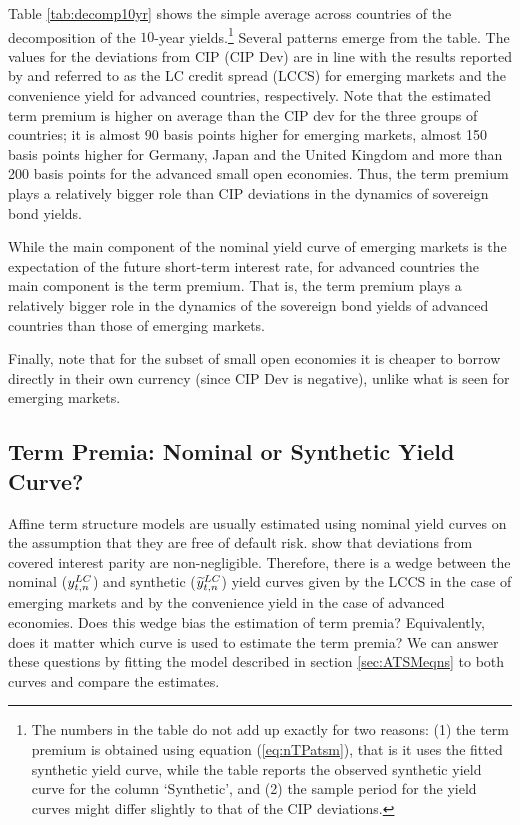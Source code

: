 {Table \ref{tab:decomp10yr} shows the simple average across countries of the decomposition of the $10$-year yields.\footnote{The numbers in the table do not add up exactly for two reasons: (1) the term premium is obtained using equation (\ref{eq:nTPatsm}), that is it uses the fitted synthetic yield curve, while the table reports the observed synthetic yield curve for the column `Synthetic', and (2) the sample period for the yield curves might differ slightly to that of the CIP deviations.} Several patterns emerge from the table. The values for the deviations from CIP (CIP Dev) are in line with the results reported by \cite{DuSchreger:2016JoF} and \cite{DuImSchreger:2018JIE} referred to as the LC credit spread (LCCS) for emerging markets and the convenience yield for advanced countries, respectively. Note that the estimated term premium is higher on average than the CIP dev for the three groups of countries; it is almost 90 basis points higher for emerging markets, almost 150 basis points higher for Germany, Japan and the United Kingdom and more than 200 basis points for the advanced small open economies. Thus, the term premium plays a relatively bigger role than CIP deviations in the dynamics of sovereign bond yields. %
	
%	

While the main component of the nominal yield curve of emerging markets is the expectation of the future short-term interest rate, for advanced countries the main component is the term premium. That is, the term premium plays a relatively bigger role in the dynamics of the sovereign bond yields of advanced countries than those of emerging markets.

Finally, note that for the subset of small open economies it is cheaper to borrow directly in their own currency (since CIP Dev is negative), unlike what is seen for emerging markets.

\subsection{Term Premia: Nominal or Synthetic Yield Curve?}
Affine term structure models are usually estimated using nominal yield curves on the assumption that they are free of default risk. \cite{DuTepperVerdelhan:2018} show that deviations from covered interest parity are non-negligible. Therefore, there is a wedge between the nominal ($y_{t,n} ^{LC}$) and synthetic ($\widetilde{y}_{t,n} ^{LC}$) yield curves given by the LCCS in the case of emerging markets and by the convenience yield in the case of advanced economies. Does this wedge bias the estimation of term premia? Equivalently, does it matter which curve is used to estimate the term premia? We can answer these questions by fitting the model described in section \ref{sec:ATSMeqns} to both curves and compare the estimates.

}
